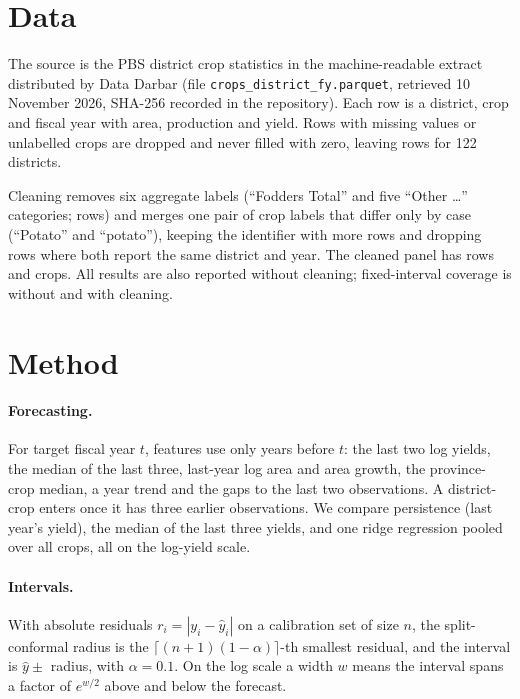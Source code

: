\documentclass[11pt]{article}
\begin{document}
\section{Data}
The source is the PBS district crop statistics in the machine-readable extract distributed by Data Darbar (file \texttt{crops\_district\_fy.parquet}, retrieved 10 November 2026, SHA-256 recorded in the repository). Each row is a district, crop and fiscal year with area, production and yield. Rows with missing values or unlabelled crops are dropped and never filled with zero, leaving \RowsIn{} rows for 122 districts.

Cleaning removes six aggregate labels (``Fodders Total'' and five ``Other \dots'' categories; \AggRows{} rows) and merges one pair of crop labels that differ only by case (``Potato'' and ``potato''), keeping the identifier with more rows and dropping \OverlapRows{} rows where both report the same district and year. The cleaned panel has \RowsOut{} rows and \Crops{} crops. All results are also reported without cleaning; fixed-interval coverage is \RawFixedCov{} without and \FixedCov{} with cleaning.

\section{Method}
\paragraph{Forecasting.} For target fiscal year $t$, features use only years before $t$: the last two log yields, the median of the last three, last-year log area and area growth, the province-crop median, a year trend and the gaps to the last two observations. A district-crop enters once it has three earlier observations. We compare persistence (last year's yield), the median of the last three yields, and one ridge regression pooled over all crops, all on the log-yield scale.

\paragraph{Intervals.} With absolute residuals $r_i = |y_i - \hat y_i|$ on a calibration set of size $n$, the split-conformal radius is the $\lceil (n+1)(1-\alpha) \rceil$-th smallest residual, and the interval is $\hat y \pm$ radius, with $\alpha = 0.1$. On the log scale a width $w$ means the interval spans a factor of $e^{w/2}$ above and below the forecast.
\end{document}

